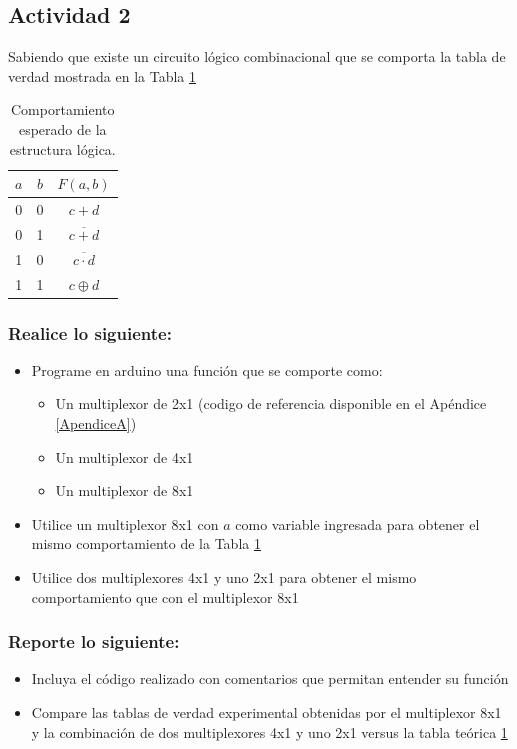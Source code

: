 \subsection{Actividad 2}
Sabiendo que existe un circuito lógico combinacional que se comporta la tabla de verdad mostrada en la Tabla \ref{tab:tv3}
\begin{table}[H]
\centering
\caption{Comportamiento esperado de la estructura lógica.}
\label{tab:tv3}
\begin{tabular}{ccc}
    \toprule 
    $a$ & $b$ & $F(a,b)$ \\ 
    \midrule
    0 & 0 & $c + d$ \\ 
    0 & 1 & $\overline{c + d}$ \\ 
    1 & 0 & $\overline{c \cdot d}$ \\ 
    1 & 1 & $c \oplus d$ \\ 
    \bottomrule
\end{tabular} 
\end{table}
\subsubsection{Realice lo siguiente:}
\begin{itemize}
    \item Programe en arduino una función que se comporte como:
    \begin{itemize}
        \item Un multiplexor de 2x1 (codigo de referencia disponible en el Apéndice \ref{ApendiceA})
        \item Un multiplexor de 4x1
        \item Un multiplexor de 8x1
    \end{itemize}
    \item Utilice un multiplexor 8x1 con $a$ como variable ingresada para obtener el mismo comportamiento de la Tabla \ref{tab:tv3}
    \item Utilice dos multiplexores 4x1 y uno 2x1 para obtener el mismo comportamiento que con el multiplexor 8x1
\end{itemize}

\subsubsection{Reporte lo siguiente:}

\begin{itemize}
    \item Incluya el código realizado con comentarios que permitan entender su función
    \item Compare las tablas de verdad experimental obtenidas por el multiplexor 8x1 y la combinación de dos multiplexores 4x1 y uno 2x1 versus la tabla teórica \ref{tab:tv3}
\end{itemize}